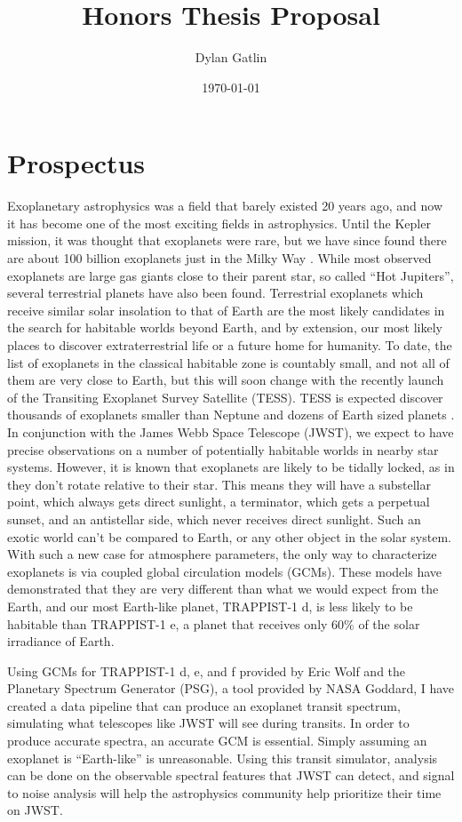 \documentclass[11pt]{article}
\title{Honors Thesis Proposal}
\author{Dylan Gatlin}
\date{\today}
\begin{document}

\maketitle
\section*{Prospectus}
Exoplanetary astrophysics was a field that barely existed 20 years ago, and now it has become one of the most exciting fields in astrophysics. Until the Kepler mission, it was thought that exoplanets were rare, but we have since found there are about 100 billion exoplanets just in the Milky Way \citep{nexoplanets}. While most observed exoplanets are large gas giants close to their parent star, so called ``Hot Jupiters'', several terrestrial planets have also been found. Terrestrial exoplanets which receive similar solar insolation to that of Earth are the most likely candidates in the search for habitable worlds beyond Earth, and by extension, our most likely places to discover extraterrestrial life or a future home for humanity. To date, the list of exoplanets in the classical habitable zone is countably small, and not all of them are very close to Earth, but this will soon change with the recently launch of the Transiting Exoplanet Survey Satellite (TESS). TESS is expected discover thousands of exoplanets smaller than Neptune and dozens of Earth sized planets \citep{tesspredict}. In conjunction with the James Webb Space Telescope (JWST), we expect to have precise observations on a number of potentially habitable worlds in nearby star systems. However, it is known that exoplanets are likely to be tidally locked, as in they don't rotate relative to their star. This means they will have a substellar point, which always gets direct sunlight, a terminator, which gets a perpetual sunset, and an antistellar side, which never receives direct sunlight. Such an exotic world can't be compared to Earth, or any other object in the solar system. With such a new case for atmosphere parameters, the only way to characterize exoplanets is via coupled global circulation models (GCMs). These models have demonstrated that they are very different than what we would expect from the Earth, and our most Earth-like planet, TRAPPIST-1 d, is less likely to be habitable than TRAPPIST-1 e, a planet that receives only 60\% of the solar irradiance of Earth\citep{wolf17}.

Using GCMs for TRAPPIST-1 d, e, and f provided by Eric Wolf and the Planetary Spectrum Generator (PSG), a tool provided by NASA Goddard, I have created a data pipeline that can produce an exoplanet transit spectrum, simulating what telescopes like JWST will see during transits. In order to produce accurate spectra, an accurate GCM is essential. Simply assuming an exoplanet is ``Earth-like'' is unreasonable. Using this transit simulator, analysis can be done on the observable spectral features that JWST can detect, and signal to noise analysis will help the astrophysics community help prioritize their time on  JWST.
\end{document}
